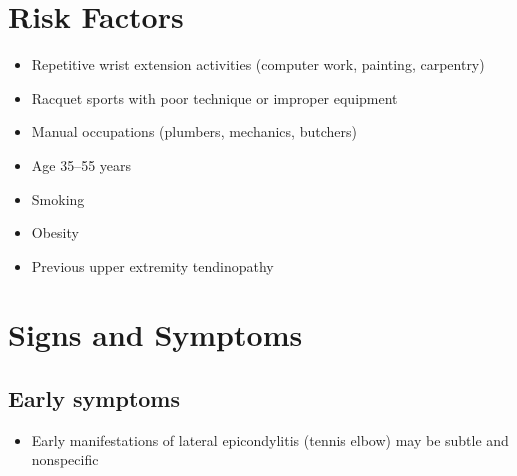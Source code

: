\section{Risk Factors}

\begin{itemize}[noitemsep]
  \item Repetitive wrist extension activities (computer work, painting, carpentry)
  \item Racquet sports with poor technique or improper equipment
  \item Manual occupations (plumbers, mechanics, butchers)
  \item Age 35--55 years
  \item Smoking
  \item Obesity
  \item Previous upper extremity tendinopathy
\end{itemize}

\section{Signs and Symptoms}

\subsection{Early symptoms}
\begin{itemize}[noitemsep]
  \item Early manifestations of lateral epicondylitis (tennis elbow) may be subtle and nonspecific
\end{itemize}

